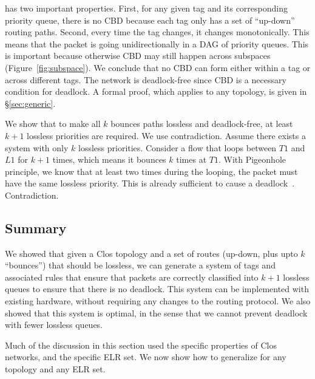  \sysname{} has two
important properties. First, for any given tag and its corresponding priority
queue, there is no CBD because each tag only has a set of ``up-down'' routing
paths.  Second, every time the tag changes, it changes monotonically. This means
that the packet is going unidirectionally in a DAG of priority queues. This is
important because otherwise CBD may still happen across subspaces
(Figure~\ref{fig:subspace}).  We conclude that no CBD can form either within a
tag or across different tags.  The network is deadlock-free since CBD is a
necessary condition for deadlock.  A formal proof, which applies to any
topology, is given in \S\ref{sec:generic}.

 We show that
to make all $k$ bounces paths lossless and deadlock-free, at least $k+1$
lossless priorities are required. We use contradiction.  Assume there exists a
system with only $k$ lossless priorities. Consider a flow that loops between
$T1$ and $L1$ for $k+1$ times, which means it bounces $k$ times at $T1$. With
Pigeonhole principle, we know that at least two times during the looping, the
packet must have the same lossless priority. This is already sufficient to cause
a deadlock~\cite{our_hotnets_paper}. Contradiction.

\subsection {Summary}

We showed that given a Clos topology and a set of routes (up-down, plus upto $k$
``bounces'') that should be lossless, we can generate a system of tags and
associated rules that ensure that packets are correctly classified into $k+1$
lossless queues to ensure that there is no deadlock.   This system can be
implemented with existing hardware, without requiring any changes to the routing
protocol. We also showed that this system is optimal, in the sense that we
cannot prevent deadlock with fewer lossless queues.

Much of the discussion in this section used the specific properties of Clos
networks, and the specific ELR set. We now show how to generalize \sysname{} for
any topology and any ELR set.
